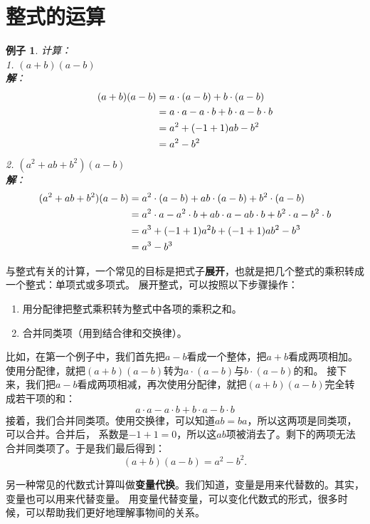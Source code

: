 \documentclass[12pt,UTF8]{ctexbook}
\newtheorem{ex}{例子}[section]
\begin{document}
\section{整式的运算}
\begin{ex}\label{ex:5-0-0}
    计算：\\
    1. $(a + b)(a - b)$\\
    \textbf{解}：
    \begin{align}
        (a + b)(a - b) &= a\cdot (a - b) + b\cdot (a - b) \notag \\
        &= a\cdot a - a\cdot b + b\cdot a - b\cdot b \notag \\
        &= a^2 + (-1 + 1)ab - b^2 \notag \\
        &= a^2 - b^2 \notag
    \end{align}
    2. $(a^2 + ab + b^2)(a - b)$\\
    \textbf{解}：
    \begin{align}
        (a^2 + ab + b^2)(a - b) &= a^2\cdot (a - b) + ab\cdot (a - b) + b^2\cdot (a - b) \notag \\
        &= a^2\cdot a - a^2\cdot b + ab\cdot a - ab\cdot b + b^2\cdot a - b^2 \cdot b \notag \\
        &= a^3 + (-1 + 1)a^2b + (-1 + 1)ab^2 - b^3\notag \\
        &= a^3 - b^3 \notag
    \end{align}
\end{ex}
与整式有关的计算，一个常见的目标是把式子\textbf{展开}，也就是把几个整式的乘积转成一个整式：单项式或多项式。
展开整式，可以按照以下步骤操作：
\begin{enumerate}
    \item 用分配律把整式乘积转为整式中各项的乘积之和。
    \item 合并同类项（用到结合律和交换律）。
\end{enumerate}
比如，在第一个例子中，我们首先把$a - b$看成一个整体，把$a + b$看成两项相加。
使用分配律，就把$(a + b)(a - b)$转为$a\cdot (a - b)$与$b\cdot (a - b)$的和。
接下来，我们把$a - b$看成两项相减，再次使用分配律，就把$(a + b)(a - b)$完全转成若干项的和：
$$ a\cdot a - a\cdot b + b\cdot a - b\cdot b$$
接着，我们合并同类项。使用交换律，可以知道$ab = ba$，所以这两项是同类项，可以合并。合并后，
系数是$-1 + 1 = 0$，所以这$ab$项被消去了。剩下的两项无法合并同类项了。于是我们最后得到：
$$(a + b)(a - b) = a^2 - b^2. $$

另一种常见的代数式计算叫做\textbf{变量代换}。我们知道，变量是用来代替数的。其实，变量也可以用来代替变量。
用变量代替变量，可以变化代数式的形式，很多时候，可以帮助我们更好地理解事物间的关系。
\end{document}
